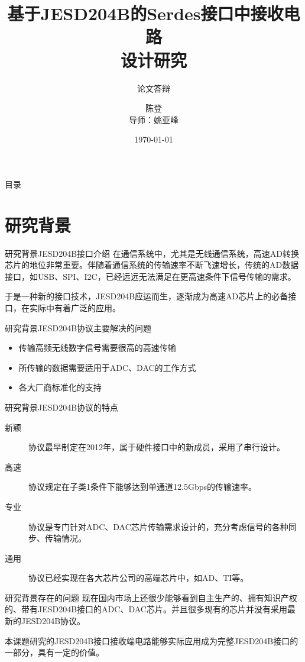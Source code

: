 \documentclass{beamer}
\title{基于JESD204B的Serdes接口中接收电路 \\ 设计研究}
\subtitle{论文答辩}
\author{陈登 \\ 导师：姚亚峰}
\date{\today}
\begin{document}
\begin{frame}
	\titlepage
\end{frame}

\begin{frame}{目录}
	\tableofcontents
\end{frame}

\section{研究背景}

\begin{frame}{研究背景}{JESD204B接口介绍}
在通信系统中，尤其是无线通信系统，高速AD转换芯片的地位非常重要。伴随着通信系统的传输速率不断飞速增长，传统的AD数据接口，如USB、SPI、I2C，已经远远无法满足在更高速条件下信号传输的需求。

于是一种新的接口技术，JESD204B应运而生，逐渐成为高速AD芯片上的必备接口，在实际中有着广泛的应用。
\end{frame}

\begin{frame}{研究背景}{JESD204B协议主要解决的问题}
  \begin{itemize}
    \item 传输高频无线数字信号需要很高的高速传输
    \item 所传输的数据需要适用于ADC、DAC的工作方式
    \item 各大厂商标准化的支持
  \end{itemize}
\end{frame}

\begin{frame}{研究背景}{JESD204B协议的特点}
  \begin{description}
    \item [新颖] 协议最早制定在2012年，属于硬件接口中的新成员，采用了串行设计。
    \item [高速] 协议规定在子类1条件下能够达到单通道12.5Gbps的传输速率。
    \item [专业] 协议是专门针对ADC、DAC芯片传输需求设计的，充分考虑信号的各种同步、传输情况。
    \item [通用] 协议已经实现在各大芯片公司的高端芯片中，如AD、TI等。
  \end{description}
\end{frame}

\begin{frame}{研究背景}{存在的问题}
现在国内市场上还很少能够看到自主生产的、拥有知识产权的、带有JESD204B接口的ADC、DAC芯片。并且很多现有的芯片并没有采用最新的JESD204B协议。

本课题研究的JESD204B接口接收端电路能够实际应用成为完整JESD204B接口的一部分，具有一定的价值。
\end{frame}
\end{document}
